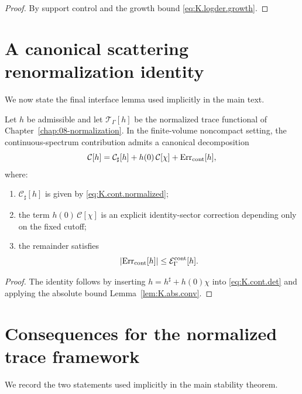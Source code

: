 \begin{proof}
By support control and the growth bound \eqref{eq:K.logder.growth}.
\end{proof}

\section{A canonical scattering renormalization identity}
\label{sec:K.canonical.identity}

We now state the final interface lemma used implicitly in the main text.

\begin{proposition}
\label{prop:K.canonical.renorm}
Let $h$ be admissible and let $\mathcal{T}_\Gamma[h]$ be the normalized trace functional of
Chapter~\ref{chap:08-normalization}.  In the finite-volume noncompact setting, the continuous-spectrum contribution
admits a canonical decomposition
\begin{equation}\label{eq:K.canonical.decomp}
\mathcal{C}[h]
=
\mathcal{C}_\sharp[h]
+
h(0)\,\mathcal{C}[\chi]
+
\mathrm{Err}_{\mathrm{cont}}[h],
\end{equation}
where:
\begin{enumerate}
\item $\mathcal{C}_\sharp[h]$ is given by \eqref{eq:K.cont.normalized};
\item the term $h(0)\,\mathcal{C}[\chi]$ is an explicit identity-sector correction depending only on the fixed cutoff;
\item the remainder satisfies
\begin{equation}\label{eq:K.cont.remainder.bound}
|\mathrm{Err}_{\mathrm{cont}}[h]|
\le
\mathcal{E}^{\mathrm{cont}}_\Gamma[h].
\end{equation}
\end{enumerate}
\end{proposition}

\begin{proof}
The identity follows by inserting $h=h^\sharp+h(0)\chi$ into \eqref{eq:K.cont.det} and applying the absolute bound
Lemma~\ref{lem:K.abs.conv}.
\end{proof}

\section{Consequences for the normalized trace framework}
\label{sec:K.consequences}

We record the two statements used implicitly in the main stability theorem.

